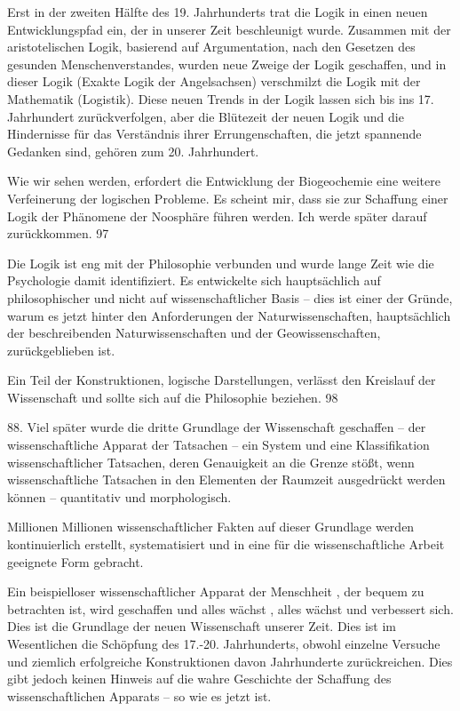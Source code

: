 \documentclass[11pt,a4paper]{book}
\begin{document}
Erst in der zweiten Hälfte des 19. Jahrhunderts trat die Logik in einen neuen Entwicklungspfad ein, der in unserer Zeit beschleunigt wurde. Zusammen mit der aristotelischen Logik, basierend auf Argumentation, nach den Gesetzen des gesunden Menschenverstandes, wurden neue Zweige der Logik geschaffen, und in dieser Logik (Exakte Logik der Angelsachsen) verschmilzt die Logik mit der Mathematik (Logistik). Diese neuen Trends in der Logik lassen sich bis ins 17. Jahrhundert zurückverfolgen, aber die Blütezeit der neuen Logik und die Hindernisse für das Verständnis ihrer Errungenschaften, die jetzt spannende Gedanken sind, gehören zum 20. Jahrhundert.



Wie wir sehen werden, erfordert die Entwicklung der Biogeochemie eine weitere Verfeinerung der logischen Probleme. Es scheint mir, dass sie zur Schaffung einer Logik der Phänomene der Noosphäre führen werden. Ich werde später darauf zurückkommen. 97



Die Logik ist eng mit der Philosophie verbunden und wurde lange Zeit wie die Psychologie damit identifiziert. Es entwickelte sich hauptsächlich auf philosophischer und nicht auf wissenschaftlicher Basis -- dies ist einer der Gründe, warum es jetzt hinter den Anforderungen der Naturwissenschaften, hauptsächlich der beschreibenden Naturwissenschaften und der Geowissenschaften, zurückgeblieben ist.



Ein Teil der Konstruktionen, logische Darstellungen, verlässt den Kreislauf der Wissenschaft und sollte sich auf die Philosophie beziehen. 98



88. Viel später wurde die dritte Grundlage der Wissenschaft geschaffen -- der wissenschaftliche Apparat der Tatsachen -- ein System und eine Klassifikation wissenschaftlicher Tatsachen, deren Genauigkeit an die Grenze stößt, wenn wissenschaftliche Tatsachen in den Elementen der Raumzeit ausgedrückt werden können -- quantitativ und morphologisch.



Millionen Millionen wissenschaftlicher Fakten auf dieser Grundlage werden kontinuierlich erstellt, systematisiert und in eine für die wissenschaftliche Arbeit geeignete Form gebracht.



Ein beispielloser wissenschaftlicher Apparat der Menschheit , der bequem zu betrachten ist, wird geschaffen und alles wächst , alles wächst und verbessert sich. Dies ist die Grundlage der neuen Wissenschaft unserer Zeit. Dies ist im Wesentlichen die Schöpfung des 17.-20. Jahrhunderts, obwohl einzelne Versuche und ziemlich erfolgreiche Konstruktionen davon Jahrhunderte zurückreichen. Dies gibt jedoch keinen Hinweis auf die wahre Geschichte der Schaffung des wissenschaftlichen Apparats -- so wie es jetzt ist.
\end{document}
